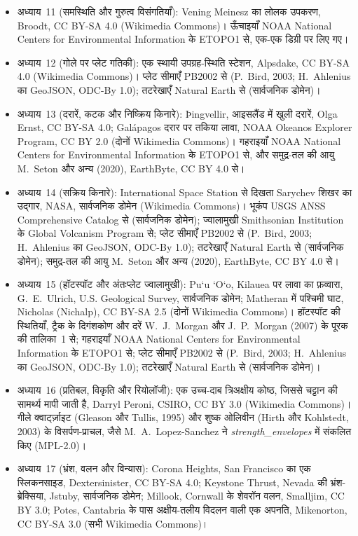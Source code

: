 \begin{itemize}
  \item अध्याय~11 (समस्थिति और गुरुत्व विसंगतियाँ): Vening Meinesz का लोलक उपकरण, Broodt, CC BY-SA 4.0 (Wikimedia Commons)। ऊँचाइयाँ NOAA National Centers for Environmental Information के ETOPO1 से, एक-एक डिग्री पर लिए गए।
  \item अध्याय~12 (गोले पर प्लेट गतिकी): एक स्थायी उपग्रह-स्थिति स्टेशन, Alpsdake, CC BY-SA 4.0 (Wikimedia Commons)। प्लेट सीमाएँ PB2002 से (P.~Bird, 2003; H.~Ahlenius का GeoJSON, ODC-By 1.0); तटरेखाएँ Natural Earth से (सार्वजनिक डोमेन)।
  \item अध्याय~13 (दरारें, कटक और निष्क्रिय किनारे): Þingvellir, आइसलैंड में खुली दरारें, Olga Ernst, CC BY-SA 4.0; Galápagos दरार पर तकिया लावा, NOAA Okeanos Explorer Program, CC BY 2.0 (दोनों Wikimedia Commons)। गहराइयाँ NOAA National Centers for Environmental Information के ETOPO1 से, और समुद्र-तल की आयु M.~Seton और अन्य (2020), EarthByte, CC BY 4.0 से।
  \item अध्याय~14 (सक्रिय किनारे): International Space Station से दिखता Sarychev शिखर का उद्गार, NASA, सार्वजनिक डोमेन (Wikimedia Commons)। भूकंप USGS ANSS Comprehensive Catalog से (सार्वजनिक डोमेन); ज्वालामुखी Smithsonian Institution के Global Volcanism Program से; प्लेट सीमाएँ PB2002 से (P.~Bird, 2003; H.~Ahlenius का GeoJSON, ODC-By 1.0); तटरेखाएँ Natural Earth से (सार्वजनिक डोमेन); समुद्र-तल की आयु M.~Seton और अन्य (2020), EarthByte, CC BY 4.0 से।
  \item अध्याय~15 (हॉटस्पॉट और अंतःप्लेट ज्वालामुखी): Pu\textquoteleft u \textquoteleft O\textquoteleft o, Kilauea पर लावा का फ़व्वारा, G.~E.~Ulrich, U.S. Geological Survey, सार्वजनिक डोमेन; Matheran में पश्चिमी घाट, Nicholas (Nichalp), CC BY-SA 2.5 (दोनों Wikimedia Commons)। हॉटस्पॉट की स्थितियाँ, ट्रैक के दिगंशकोण और दरें W.~J.~Morgan और J.~P.~Morgan (2007) के पूरक की तालिका~1 से; गहराइयाँ NOAA National Centers for Environmental Information के ETOPO1 से; प्लेट सीमाएँ PB2002 से (P.~Bird, 2003; H.~Ahlenius का GeoJSON, ODC-By 1.0); तटरेखाएँ Natural Earth से (सार्वजनिक डोमेन)।
  \item अध्याय~16 (प्रतिबल, विकृति और रियोलॉजी): एक उच्च-दाब त्रिअक्षीय कोष्ठ, जिससे चट्टान की सामर्थ्य मापी जाती है, Darryl Peroni, CSIRO, CC BY 3.0 (Wikimedia Commons)। गीले क्वार्ट्ज़ाइट (Gleason और Tullis, 1995) और शुष्क ओलिवीन (Hirth और Kohlstedt, 2003) के विसर्पण-प्राचल, जैसे M.~A.~Lopez-Sanchez ने \emph{strength\_envelopes} में संकलित किए (MPL-2.0)।
  \item अध्याय~17 (भ्रंश, वलन और विन्यास): Corona Heights, San Francisco का एक स्लिकनसाइड, Dextersinister, CC BY-SA 4.0; Keystone Thrust, Nevada की भ्रंश-ब्रेक्सिया, Jstuby, सार्वजनिक डोमेन; Millook, Cornwall के शेवरॉन वलन, Smalljim, CC BY 3.0; Potes, Cantabria के पास अक्षीय-तलीय विदलन वाली एक अपनति, Mikenorton, CC BY-SA 3.0 (सभी Wikimedia Commons)।

\end{itemize}
